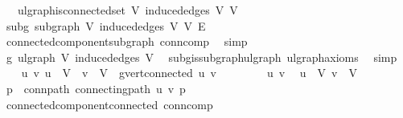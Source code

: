 \begin{isabellebody}
\ \ \ {\isachardoublequoteopen}ulgraph{\isachardot}{\kern0pt}is{\isacharunderscore}{\kern0pt}connected{\isacharunderscore}{\kern0pt}set\ V{\isacharprime}{\kern0pt}\ {\isacharparenleft}{\kern0pt}induced{\isacharunderscore}{\kern0pt}edges\ V{\isacharprime}{\kern0pt}{\isacharparenright}{\kern0pt}\ V{\isacharprime}{\kern0pt}{\isachardoublequoteclose}\isanewline
%
\isadelimproof
%
\endisadelimproof
%
\isatagproof
{}\isamarkupfalse%
{\isacharminus}{\kern0pt}\isanewline
\ \ \isamarkupfalse%
\ subg{\isacharcolon}{\kern0pt}\ subgraph\ V{\isacharprime}{\kern0pt}\ {\isachardoublequoteopen}induced{\isacharunderscore}{\kern0pt}edges\ V{\isacharprime}{\kern0pt}{\isachardoublequoteclose}\ V\ E\ \isamarkupfalse%
\ connected{\isacharunderscore}{\kern0pt}component{\isacharunderscore}{\kern0pt}subgraph\ conn{\isacharunderscore}{\kern0pt}comp\ \isamarkupfalse%
\ simp\isanewline
\ \ \isamarkupfalse%
\ g{\isacharprime}{\kern0pt}{\isacharcolon}{\kern0pt}\ ulgraph\ V{\isacharprime}{\kern0pt}\ {\isachardoublequoteopen}induced{\isacharunderscore}{\kern0pt}edges\ V{\isacharprime}{\kern0pt}{\isachardoublequoteclose}\ \isamarkupfalse%
\ subg{\isachardot}{\kern0pt}is{\isacharunderscore}{\kern0pt}subgraph{\isacharunderscore}{\kern0pt}ulgraph\ ulgraph{\isacharunderscore}{\kern0pt}axioms\ \isamarkupfalse%
\ simp\isanewline
\ \ \isamarkupfalse%
\ {\isachardoublequoteopen}{\isasymAnd}u\ v{\isachardot}{\kern0pt}\ u\ {\isasymin}\ V{\isacharprime}{\kern0pt}\ {\isasymLongrightarrow}\ v\ {\isasymin}\ V{\isacharprime}{\kern0pt}\ {\isasymLongrightarrow}\ g{\isacharprime}{\kern0pt}{\isachardot}{\kern0pt}vert{\isacharunderscore}{\kern0pt}connected\ u\ v{\isachardoublequoteclose}\isanewline
\ \ \isamarkupfalse%
{\isacharminus}{\kern0pt}\isanewline
\ \ \ \ \isamarkupfalse%
\ u\ v\ \isamarkupfalse%
\ {\isachardoublequoteopen}u\ {\isasymin}\ V{\isacharprime}{\kern0pt}{\isachardoublequoteclose}\ {\isachardoublequoteopen}v\ {\isasymin}\ V{\isacharprime}{\kern0pt}{\isachardoublequoteclose}\isanewline
\ \ \ \ \isamarkupfalse%
\ \isamarkupfalse%
\ p\ \ conn{\isacharunderscore}{\kern0pt}path{\isacharcolon}{\kern0pt}\ {\isachardoublequoteopen}connecting{\isacharunderscore}{\kern0pt}path\ u\ v\ p{\isachardoublequoteclose}\ \isamarkupfalse%
\ connected{\isacharunderscore}{\kern0pt}component{\isacharunderscore}{\kern0pt}connected\ conn{\isacharunderscore}{\kern0pt}comp\ \isamarkupfalse%

\end{isabellebody}
